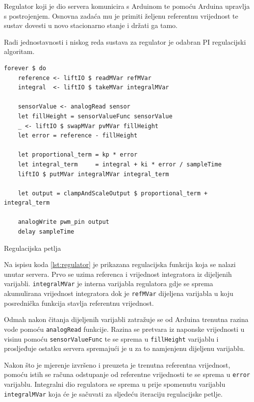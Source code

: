 Regulator koji je dio servera komunicira s Arduinom te pomoću Arduina upravlja s
postrojenjem. Osnovna zadaća mu je primiti željenu referentnu vrijednost te
sustav dovesti u novo stacionarno stanje i držati ga tamo.

Radi jednostavnosti i niskog reda sustava za regulator je odabran PI
regulacijski algoritam.

\begin{listing}[H]
\centering
\begin{verbatim}
forever $ do
    reference <- liftIO $ readMVar refMVar
    integral  <- liftIO $ takeMVar integralMVar

    sensorValue <- analogRead sensor
    let fillHeight = sensorValueFunc sensorValue
    _ <- liftIO $ swapMVar pvMVar fillHeight
    let error = reference - fillHeight

    let proportional_term = kp * error
    let integral_term     = integral + ki * error / sampleTime
    liftIO $ putMVar integralMVar integral_term

    let output = clampAndScaleOutput $ proportional_term + integral_term

    analogWrite pwm_pin output
    delay sampleTime
\end{verbatim}
\caption{Regulacijska petlja}
\label{lst:regulator}
\end{listing}

Na ispisu koda \ref{lst:regulator} je prikazana regulacijska funkcija koja se
nalazi unutar servera. Prvo se uzima referenca i vrijednost integratora iz dijeljenih varijabli.
\texttt{integralMVar} je interna varijabla regulatora gdje se
sprema akumulirana vrijednost integratora dok je \texttt{refMVar}
dijeljena varijabla u koju posrednička funkcija stavlja referentnu vrijednost.

Odmah nakon čitanja dijeljenih varijabli zatražuje se od Arduina trenutna
razina vode pomoću \texttt{analogRead} funkcije. Razina se pretvara
iz naponske vrijednosti u visinu pomoću \texttt{sensorValueFunc} te
se sprema u \texttt{fillHeight} varijablu i prosljeđuje ostatku
servera spremajući je u za to namjenjenu dijeljenu varijablu.

Nakon što je mjerenje izvršeno i preuzeta je trenutna referentna vrijednost,
pomoću istih se računa odstupanje od referentne vrijednosti te se sprema u
\texttt{error} varijablu. Integralni dio regulatora se sprema u
prije spomenutu varijablu \texttt{integralMVar} koja će je
sačuvati za sljedeću iteraciju regulacijske petlje.

